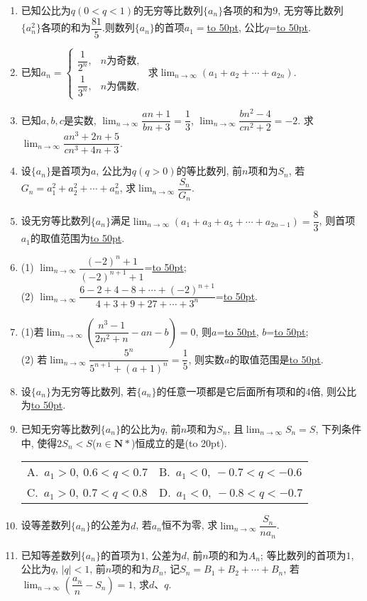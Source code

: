 \documentclass[10pt,a4paper]{article}
\newcommand{\blank}[1]{\underline{\hbox to #1pt{}}}
\newcommand{\bracket}[1]{(\hbox to #1pt{})}
\newcommand{\twoch}[4]{\par\begin{tabular}{p{.46\textwidth}p{.46\textwidth}}
A.~#1& B.~#2\\
C.~#3& D.~#4
\end{tabular}}
\begin{document}
\begin{enumerate}[1.]
\begin{center}
\begin{tikzpicture}[>=latex, line cap = round, line join = round]
\end{tikzpicture}
\end{center}
\item 已知公比为$q(0<q<1)$的无穷等比数列$\{a_n\}$各项的和为$9$, 无穷等比数列$\{a_n^2\}$各项的和为$\dfrac{81}5$.则数列$\{a_n\}$的首项$a_1=$\blank{50}, 公比$q$=\blank{50}.
\item 已知$a_n=\begin{cases} \dfrac 1{2^n}, & n\text{为奇数}, \\ \dfrac 1{3^n}, & n\text{为偶数}, \end{cases}$ 求$\displaystyle\lim_{n\to \infty}(a_1+a_2+\cdots +a_{2n})$.
\item 已知$a,b,c$是实数, $\displaystyle\lim_{n\to \infty}\dfrac{an+1}{bn+3}=\dfrac 13$, $\displaystyle\lim_{n\to \infty}\dfrac{bn^2-4}{cn^2+2}=-2$. 求$\displaystyle\lim_{n\to \infty}\dfrac{an^3+2n+5}{cn^3+4n+3}$.
\item 设$\{a_n\}$是首项为$a$, 公比为$q(q>0)$的等比数列, 前$n$项和为$S_n$, 若$G_n=a_1^2+a_2^2+\cdots+a_n^2$, 求$\displaystyle\lim_{n\to \infty}\dfrac{S_n}{G_n}$.
\item 设无穷等比数列$\{a_n\}$满足$\displaystyle\lim_{n\to \infty}(a_1+a_3+a_5+\cdots +a_{2n-1})=\dfrac 83$, 则首项$a_1$的取值范围为\blank{50}.
\item (1) $\displaystyle\lim_{n\to \infty}\dfrac{(-2)^n+1}{(-2)^{n+1}+1}$=\blank{50};\\
(2) $\displaystyle\lim_{n\to \infty}\dfrac{6-2+4-8+\cdots+(-2)^{n+1}}{4+3+9+27+\cdots+3^n}$=\blank{50}.
\item (1)若$\displaystyle\lim_{n\to \infty}(\dfrac{n^3-1}{2n^2+n}-an-b)=0$, 则$a$=\blank{50}, $b$=\blank{50};\\
(2) 若$\displaystyle\lim_{n\to \infty}\dfrac{5^n}{5^{n+1}+(a+1)^n}=\dfrac 15$, 则实数$a$的取值范围是\blank{50}.
\item 设$\{a_n\}$为无穷等比数列, 若$\{a_n\}$的任意一项都是它后面所有项和的$4$倍, 则公比为\blank{50}.
\item 已知无穷等比数列$\{a_n\}$的公比为$q$, 前$n$项和为$S_n$, 且$\displaystyle\lim_{n\to \infty}S_n=S$, 下列条件中, 使得$2S_n<S$($n\in \mathbf{N}*$)恒成立的是\bracket{20}.
\twoch{$a_1>0,\ 0.6<q<0.7$}{$a_1<0,\ -0.7<q<-0.6$}{$a_1>0, \ 0.7<q<0.8$}{$a_1<0,\ -0.8<q<-0.7$}
\item 设等差数列$\{a_n\}$的公差为$d$, 若$a_n$恒不为零, 求$\displaystyle\lim_{n\to \infty}\dfrac{S_n}{na_n}$.
\item 已知等差数列$\{a_n\}$的首项为$1$, 公差为$d$, 前$n$项的和为$A_n$; 等比数列的首项为$1$, 公比为$q$, $|q|<1$, 前$n$项的和为$B_n$, 记$S_n=B_1+B_2+\cdots+B_n$, 若$\displaystyle\lim_{n\to \infty}(\dfrac{a_n}n-S_n)=1$, 求$d$、$q$.

\end{enumerate}
\end{document}
